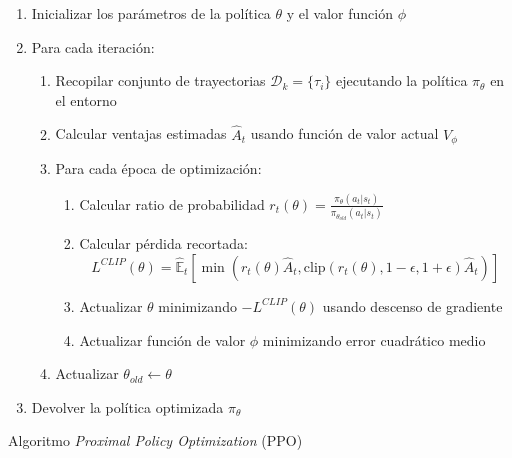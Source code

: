 \begin{algorithm}[H]
  \label{alg2}
  \SetAlgoLined
  \medskip
  \begin{enumerate}
    \item Inicializar los parámetros de la política $\theta$ y el valor función $\phi$
    \item Para cada iteración:
          \begin{enumerate}
            \item Recopilar conjunto de trayectorias $\mathcal{D}_k = \{\tau_i\}$ ejecutando la política $\pi_\theta$ en el entorno
            \item Calcular ventajas estimadas $\hat{A}_t$ usando función de valor actual $V_\phi$
            \item Para cada época de optimización:
                  \begin{enumerate}
                    \item Calcular ratio de probabilidad $r_t(\theta) = \frac{\pi_\theta(a_t|s_t)}{\pi_{\theta_{old}}(a_t|s_t)}$
                    \item Calcular pérdida recortada:
                          $$L^{CLIP}(\theta) = \hat{\mathbb{E}}_t[\min(r_t(\theta)\hat{A}_t, \text{clip}(r_t(\theta), 1-\epsilon, 1+\epsilon)\hat{A}_t)]$$
                    \item Actualizar $\theta$ minimizando $-L^{CLIP}(\theta)$ usando descenso de gradiente
                    \item Actualizar función de valor $\phi$ minimizando error cuadrático medio
                  \end{enumerate}
            \item Actualizar $\theta_{old} \leftarrow \theta$
          \end{enumerate}
    \item Devolver la política optimizada $\pi_\theta$
  \end{enumerate}
  \caption{Algoritmo \textit{Proximal Policy Optimization} (PPO)}
\end{algorithm}